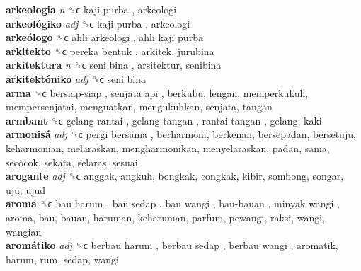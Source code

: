 \textbf{arkeologia} \emph{n}  ␝ϲ   kaji purba , arkeologi  \\
\textbf{arkeológiko} \emph{adj}  ␝ϲ   kaji purba , arkeologi  \\
\textbf{arkeólogo} ␝ϲ   ahli arkeologi ,  ahli kaji purba   \\
\textbf{arkitekto} ␝ϲ   pereka bentuk , arkitek, jurubina  \\
\textbf{arkitektura} \emph{n}  ␝ϲ   seni bina , arsitektur, senibina  \\
\textbf{arkitektóniko} \emph{adj}  ␝ϲ   seni bina   \\
\textbf{arma} ␝ϲ   bersiap-siap ,  senjata api , berkubu, lengan, memperkukuh, mempersenjatai, menguatkan, mengukuhkan, senjata, tangan  \\
\textbf{armbant} ␝ϲ   gelang rantai ,  gelang tangan ,  rantai tangan , gelang, kaki  \\
\textbf{armonisá} \emph{adj}  ␝ϲ   pergi bersama , berharmoni, berkenan, bersepadan, bersetuju, keharmonian, melaraskan, mengharmonikan, menyelaraskan, padan, sama, secocok, sekata, selaras, sesuai  \\
\textbf{arogante} \emph{adj}  ␝ϲ  anggak, angkuh, bongkak, congkak, kibir, sombong, songar, uju, ujud  \\
\textbf{aroma} ␝ϲ   bau harum ,  bau sedap ,  bau wangi ,  bau-bauan ,  minyak wangi , aroma, bau, bauan, haruman, keharuman, parfum, pewangi, raksi, wangi, wangian  \\
\textbf{aromátiko} \emph{adj}  ␝ϲ   berbau harum ,  berbau sedap ,  berbau wangi , aromatik, harum, rum, sedap, wangi  \\
